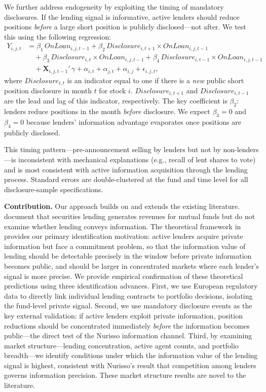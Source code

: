 We further address endogeneity by exploiting the timing of mandatory disclosures. If the lending signal is informative, active lenders should reduce positions \textit{before} a large short position is publicly disclosed---not after. We test this using the following regression:
\begin{align} \label{eq:big-shorts}
Y_{i,j,t} & = \beta_1\, \mathit{OnLoan}_{i,j,t-1} + \beta_2\, \mathit{Disclosure}_{i,t+1} \times \mathit{OnLoan}_{i,j,t-1} \nonumber\\
& \quad + \beta_3\, \mathit{Disclosure}_{i,t} \times \mathit{OnLoan}_{i,j,t-1} + \beta_4\, \mathit{Disclosure}_{i,t-1} \times \mathit{OnLoan}_{i,j,t-1} \nonumber\\
& \quad + \mathbf{X}_{i,j,t-1}'\,\gamma + \alpha_{i,t} + \alpha_{j,t} + \alpha_{i,j} + \epsilon_{i,j,t},
\end{align}
where $\mathit{Disclosure}_{i,t}$ is an indicator equal to one if there is a \textit{new} public short position disclosure in month $t$ for stock $i$. $\mathit{Disclosure}_{i,t+1}$ and $\mathit{Disclosure}_{i,t-1}$ are the lead and lag of this indicator, respectively. The key coefficient is $\beta_2$: lenders reduce positions in the month \textit{before} disclosure. We expect $\beta_3 = 0$ and $\beta_4 = 0$ because lenders' information advantage evaporates once positions are publicly disclosed.

This timing pattern---pre-announcement selling by lenders but not by non-lenders---is inconsistent with mechanical explanations (e.g., recall of lent shares to vote) and is most consistent with active information acquisition through the lending process. Standard errors are double-clustered at the fund and time level for all disclosure-sample specifications.

\textbf{Contribution.} Our approach builds on and extends the existing literature. \citet{EvansFerreiraPrado2017} document that securities lending generates revenues for mutual funds but do not examine whether lending conveys information. The theoretical framework in \citet{Nurisso2026} provides our primary identification motivation: active lenders acquire private information but face a commitment problem, so that the information value of lending should be detectable precisely in the window before private information becomes public, and should be larger in concentrated markets where each lender's signal is more precise. We provide empirical confirmation of these theoretical predictions using three identification advances. First, we use European regulatory data to directly link individual lending contracts to portfolio decisions, isolating the fund-level private signal. Second, we use mandatory disclosure events as the key external validation: if active lenders exploit private information, position reductions should be concentrated immediately \emph{before} the information becomes public---the direct test of the Nurisso information channel. Third, by examining market structure---lending concentration, active agent counts, and portfolio breadth---we identify conditions under which the information value of the lending signal is highest, consistent with Nurisso's result that competition among lenders governs information precision. These market structure results are novel to the literature.
